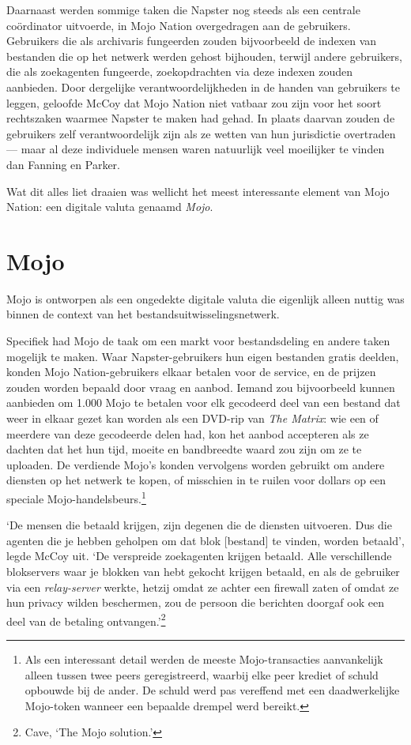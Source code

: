 \documentclass[smalldemyvopaper,11pt,twoside,onecolumn,openright,extrafontsizes,hidelinks]{memoir}
\begin{document}
Daarnaast werden sommige taken die Napster nog steeds als een centrale
coördinator uitvoerde, in Mojo Nation overgedragen aan de gebruikers.
Gebruikers die als archivaris fungeerden zouden bijvoorbeeld de indexen
van bestanden die op het netwerk werden gehost bijhouden, terwijl andere
gebruikers, die als zoekagenten fungeerde, zoekopdrachten via deze
indexen zouden aanbieden. Door dergelijke verantwoordelijkheden in de
handen van gebruikers te leggen, geloofde McCoy dat Mojo Nation niet
vatbaar zou zijn voor het soort rechtszaken waarmee Napster te maken had
gehad. In plaats daarvan zouden de gebruikers zelf verantwoordelijk zijn
als ze wetten van hun jurisdictie overtraden --- maar al deze
individuele mensen waren natuurlijk veel moeilijker te vinden dan
Fanning en Parker.

Wat dit alles liet draaien was wellicht het meest interessante element
van Mojo Nation: een digitale valuta genaamd \emph{Mojo}.

\section{Mojo}\label{mojo}

Mojo is ontworpen als een ongedekte digitale valuta die eigenlijk alleen
nuttig was binnen de context van het bestandsuitwisselingsnetwerk.

Specifiek had Mojo de taak om een markt voor bestandsdeling en andere
taken mogelijk te maken. Waar Napster-gebruikers hun eigen bestanden
gratis deelden, konden Mojo Nation-gebruikers elkaar betalen voor de
service, en de prijzen zouden worden bepaald door vraag en aanbod.
Iemand zou bijvoorbeeld kunnen aanbieden om 1.000 Mojo te betalen voor
elk gecodeerd deel van een bestand dat weer in elkaar gezet kan worden
als een DVD-rip van \emph{The Matrix}: wie een of meerdere van deze
gecodeerde delen had, kon het aanbod accepteren als ze dachten dat het
hun tijd, moeite en bandbreedte waard zou zijn om ze te uploaden. De
verdiende Mojo's konden vervolgens worden gebruikt om andere diensten op
het netwerk te kopen, of misschien in te ruilen voor dollars op een
speciale Mojo-handelsbeurs.\footnote{Als een interessant detail werden
  de meeste Mojo-transacties aanvankelijk alleen tussen twee peers
  geregistreerd, waarbij elke peer krediet of schuld opbouwde bij de
  ander. De schuld werd pas vereffend met een daadwerkelijke Mojo-token
  wanneer een bepaalde drempel werd bereikt.}

`De mensen die betaald krijgen, zijn degenen die de diensten uitvoeren.
Dus die agenten die je hebben geholpen om dat blok {[}bestand{]} te
vinden, worden betaald', legde McCoy uit. `De verspreide zoekagenten
krijgen betaald. Alle verschillende blokservers waar je blokken van hebt
gekocht krijgen betaald, en als de gebruiker via een \emph{relay-server}
werkte, hetzij omdat ze achter een firewall zaten of omdat ze hun
privacy wilden beschermen, zou de persoon die berichten doorgaf ook een
deel van de betaling ontvangen.'\footnote{Cave, `The Mojo solution.'}
\end{document}
